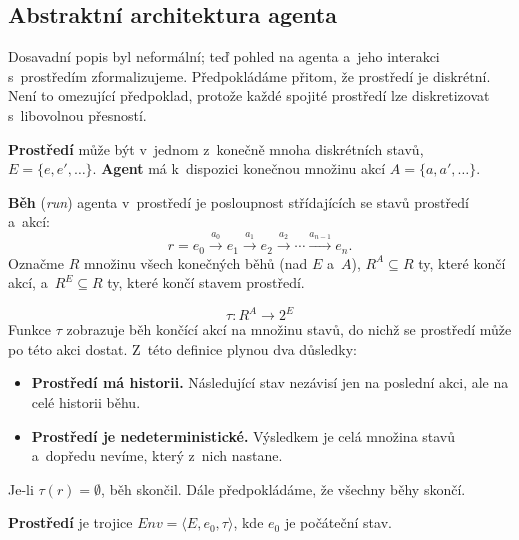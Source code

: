 \documentclass[11pt,a4paper]{article}
\theoremstyle{definition}
\begin{document}
\subsection{Abstraktní architektura agenta}

Dosavadní popis byl neformální; teď pohled na agenta a~jeho interakci s~prostředím
zformalizujeme. Předpokládáme přitom, že prostředí je diskrétní. Není to omezující předpoklad,
protože každé spojité prostředí lze diskretizovat s~libovolnou přesností.

\begin{defbox}
\textbf{Prostředí} může být v~jednom z~konečně mnoha diskrétních stavů,
$E = \{e, e', \dots\}$. \textbf{Agent} má k~dispozici konečnou množinu akcí
$A = \{a, a', \dots\}$.

\textbf{Běh} (\emph{run}) agenta v~prostředí je posloupnost střídajících se stavů prostředí
a~akcí:
\[
r = e_0 \xrightarrow{a_0} e_1 \xrightarrow{a_1} e_2 \xrightarrow{a_2} \cdots
\xrightarrow{a_{n-1}} e_n .
\]
Označme $R$ množinu všech konečných běhů (nad $E$ a~$A$), $R^A \subseteq R$ ty, které končí akcí,
a~$R^E \subseteq R$ ty, které končí stavem prostředí.
\end{defbox}

\begin{defbox}
\[
\tau : R^A \to 2^E
\]
Funkce $\tau$ zobrazuje běh končící akcí na množinu stavů, do nichž se prostředí může
po této akci dostat. Z~této definice plynou dva důsledky:
\begin{itemize}
\item \textbf{Prostředí má historii.} Následující stav nezávisí jen na poslední akci, ale na
  celé historii běhu.
\item \textbf{Prostředí je nedeterministické.} Výsledkem je celá množina stavů a~dopředu nevíme,
  který z~nich nastane.
\end{itemize}
Je-li $\tau(r) = \emptyset$, běh skončil. Dále předpokládáme, že všechny běhy skončí.

\textbf{Prostředí} je trojice $\mathit{Env} = \langle E, e_0, \tau\rangle$, kde $e_0$ je počáteční stav.
\end{defbox}
\end{document}
